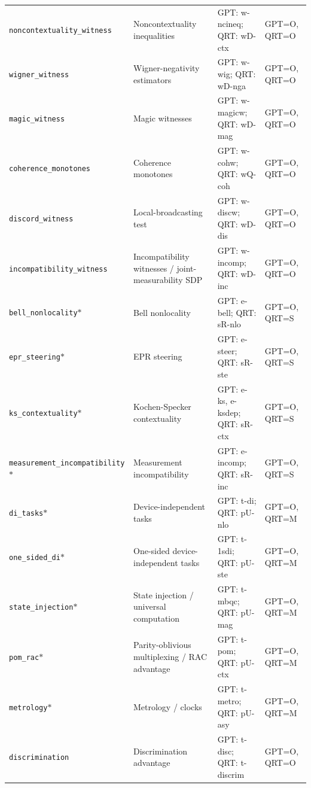 \begin{longtable}{@{}p{3.1cm}p{3.6cm}p{5.0cm}p{2.9cm}@{}}
\texttt{noncontextuality\_\allowbreak{{}}witness} & Noncontextuality inequalities & GPT: w-ncineq; QRT: wD-ctx & GPT=O, QRT=O \\
\texttt{wigner\_\allowbreak{{}}witness} & Wigner-negativity estimators & GPT: w-wig; QRT: wD-nga & GPT=O, QRT=O \\
\texttt{magic\_\allowbreak{{}}witness} & Magic witnesses & GPT: w-magicw; QRT: wD-mag & GPT=O, QRT=O \\
\texttt{coherence\_\allowbreak{{}}monotones} & Coherence monotones & GPT: w-cohw; QRT: wQ-coh & GPT=O, QRT=O \\
\texttt{discord\_\allowbreak{{}}witness} & Local-broadcasting test & GPT: w-discw; QRT: wD-dis & GPT=O, QRT=O \\
\texttt{incompatibility\_\allowbreak{{}}witness} & Incompatibility witnesses / joint-measurability SDP & GPT: w-incomp; QRT: wD-inc & GPT=O, QRT=O \\
\texttt{bell\_\allowbreak{{}}nonlocality}$\ast$ & Bell nonlocality & GPT: e-bell; QRT: sR-nlo & GPT=O, QRT=S \\
\texttt{epr\_\allowbreak{{}}steering}$\ast$ & EPR steering & GPT: e-steer; QRT: sR-ste & GPT=O, QRT=S \\
\texttt{ks\_\allowbreak{{}}contextuality}$\ast$ & Kochen-Specker contextuality & GPT: e-ks, e-ksdep; QRT: sR-ctx & GPT=O, QRT=S \\
\texttt{measurement\_\allowbreak{{}}incompatibility}$\ast$ & Measurement incompatibility & GPT: e-incomp; QRT: sR-inc & GPT=O, QRT=S \\
\texttt{di\_\allowbreak{{}}tasks}$\ast$ & Device-independent tasks & GPT: t-di; QRT: pU-nlo & GPT=O, QRT=M \\
\texttt{one\_\allowbreak{{}}sided\_\allowbreak{{}}di}$\ast$ & One-sided device-independent tasks & GPT: t-1sdi; QRT: pU-ste & GPT=O, QRT=M \\
\texttt{state\_\allowbreak{{}}injection}$\ast$ & State injection / universal computation & GPT: t-mbqc; QRT: pU-mag & GPT=O, QRT=M \\
\texttt{pom\_\allowbreak{{}}rac}$\ast$ & Parity-oblivious multiplexing / RAC advantage & GPT: t-pom; QRT: pU-ctx & GPT=O, QRT=M \\
\texttt{metrology}$\ast$ & Metrology / clocks & GPT: t-metro; QRT: pU-asy & GPT=O, QRT=M \\
\texttt{discrimination} & Discrimination advantage & GPT: t-disc; QRT: t-discrim & GPT=O, QRT=O \\
\bottomrule\end{longtable}

